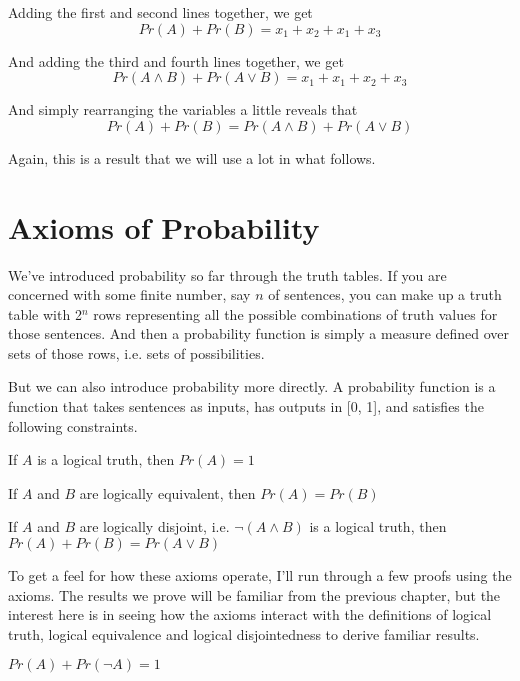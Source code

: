 Adding the first and second lines together, we get
\begin{equation*}
Pr(A) + Pr(B) = x_1 + x_2 + x_1 + x_3
\end{equation*}

And adding the third and fourth lines together, we get
\begin{equation*}
Pr(A \wedge B) + Pr(A \vee B) = x_1 + x_1 + x_2 + x_3
\end{equation*}

And simply rearranging the variables a little reveals that
\begin{equation*}
Pr(A) + Pr(B) =Pr(A \wedge B) + Pr(A \vee B)
\end{equation*}

Again, this is a result that we will use a lot in what follows.

\section{Axioms of Probability}
We've introduced probability so far through the truth tables. If you are concerned with some finite number, say $n$ of sentences, you can make up a truth table with 2$^n$ rows representing all the possible combinations of truth values for those sentences. And then a probability function is simply a measure defined over sets of those rows, i.e. sets of possibilities.

But we can also introduce probability more directly. A probability function is a function that takes sentences as inputs, has outputs in [0, 1], and satisfies the following constraints.

\begin{itemize*}
\item If $A$ is a logical truth, then $Pr(A) = 1$
\item If $A$ and $B$ are logically equivalent, then $Pr(A) = Pr(B)$
\item If $A$ and $B$ are logically disjoint, i.e. $\neg(A \wedge B)$ is a logical truth, then $Pr(A) + Pr(B) = Pr(A \vee B)$
\end{itemize*}

To get a feel for how these axioms operate, I'll run through a few proofs using the axioms. The results we prove will be familiar from the previous chapter, but the interest here is in seeing how the axioms interact with the definitions of logical truth, logical equivalence and logical disjointedness to derive familiar results.

\begin{itemize*}
\item \textbf{$Pr(A) + Pr(\neg A) = 1$}
\end{itemize*}

